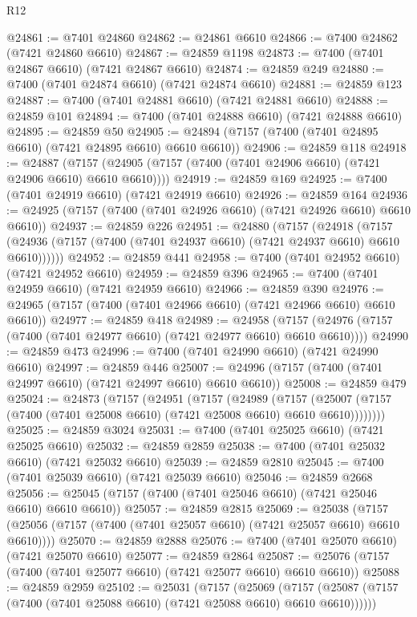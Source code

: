 \begin{lexlean}{R12}
\begin{coremodule}
@24861 := @7401 @24860
@24862 := @24861 @6610
@24866 := @7400 @24862 (@7421 @24860 @6610)
@24867 := @24859 @1198
@24873 := @7400 (@7401 @24867 @6610) (@7421 @24867 @6610)
@24874 := @24859 @249
@24880 := @7400 (@7401 @24874 @6610) (@7421 @24874 @6610)
@24881 := @24859 @123
@24887 := @7400 (@7401 @24881 @6610) (@7421 @24881 @6610)
@24888 := @24859 @101
@24894 := @7400 (@7401 @24888 @6610) (@7421 @24888 @6610)
@24895 := @24859 @50
@24905 := @24894 (@7157 (@7400 (@7401 @24895 @6610) (@7421 @24895 @6610) @6610 @6610))
@24906 := @24859 @118
@24918 := @24887
    (@7157 (@24905 (@7157 (@7400 (@7401 @24906 @6610) (@7421 @24906 @6610) @6610 @6610))))
@24919 := @24859 @169
@24925 := @7400 (@7401 @24919 @6610) (@7421 @24919 @6610)
@24926 := @24859 @164
@24936 := @24925 (@7157 (@7400 (@7401 @24926 @6610) (@7421 @24926 @6610) @6610 @6610))
@24937 := @24859 @226
@24951 := @24880
    (@7157
      (@24918
        (@7157 (@24936 (@7157 (@7400 (@7401 @24937 @6610) (@7421 @24937 @6610) @6610 @6610))))))
@24952 := @24859 @441
@24958 := @7400 (@7401 @24952 @6610) (@7421 @24952 @6610)
@24959 := @24859 @396
@24965 := @7400 (@7401 @24959 @6610) (@7421 @24959 @6610)
@24966 := @24859 @390
@24976 := @24965 (@7157 (@7400 (@7401 @24966 @6610) (@7421 @24966 @6610) @6610 @6610))
@24977 := @24859 @418
@24989 := @24958
    (@7157 (@24976 (@7157 (@7400 (@7401 @24977 @6610) (@7421 @24977 @6610) @6610 @6610))))
@24990 := @24859 @473
@24996 := @7400 (@7401 @24990 @6610) (@7421 @24990 @6610)
@24997 := @24859 @446
@25007 := @24996 (@7157 (@7400 (@7401 @24997 @6610) (@7421 @24997 @6610) @6610 @6610))
@25008 := @24859 @479
@25024 := @24873
    (@7157
      (@24951
        (@7157
          (@24989
            (@7157
              (@25007 (@7157 (@7400 (@7401 @25008 @6610) (@7421 @25008 @6610) @6610 @6610))))))))
@25025 := @24859 @3024
@25031 := @7400 (@7401 @25025 @6610) (@7421 @25025 @6610)
@25032 := @24859 @2859
@25038 := @7400 (@7401 @25032 @6610) (@7421 @25032 @6610)
@25039 := @24859 @2810
@25045 := @7400 (@7401 @25039 @6610) (@7421 @25039 @6610)
@25046 := @24859 @2668
@25056 := @25045 (@7157 (@7400 (@7401 @25046 @6610) (@7421 @25046 @6610) @6610 @6610))
@25057 := @24859 @2815
@25069 := @25038
    (@7157 (@25056 (@7157 (@7400 (@7401 @25057 @6610) (@7421 @25057 @6610) @6610 @6610))))
@25070 := @24859 @2888
@25076 := @7400 (@7401 @25070 @6610) (@7421 @25070 @6610)
@25077 := @24859 @2864
@25087 := @25076 (@7157 (@7400 (@7401 @25077 @6610) (@7421 @25077 @6610) @6610 @6610))
@25088 := @24859 @2959
@25102 := @25031
    (@7157
      (@25069
        (@7157 (@25087 (@7157 (@7400 (@7401 @25088 @6610) (@7421 @25088 @6610) @6610 @6610))))))

\end{coremodule}
\end{lexlean}
